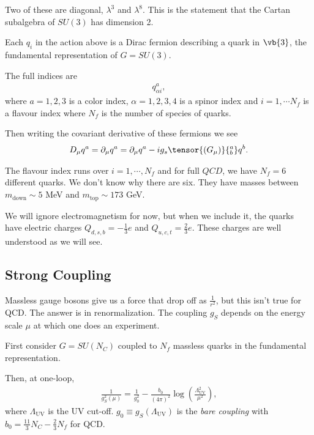 Two of these are diagonal, $\lambda^3$ and $\lambda^{8}$. This is the statement that the Cartan subalgebra of $SU\left( 3 \right) $ has dimension 2.

Each $q_{i}$ in the action above is a Dirac fermion describing a quark in $\vb{3}$, the fundamental representation of $G = SU\left( 3 \right) $.

The full indices are
\begin{align}
    q^{a}_{\alpha i}
,\end{align}
where $a=1,2,3$ is a color index, $\alpha = 1,2,3,4$ is a spinor index and $i=1,\cdots N_f$ is a flavour index where $N_f$ is the number of species of quarks.

Then writing the covariant derivative of these fermions we see
\begin{align}
    D_\mu q^{a} = \partial_\mu q^{a} = \partial_\mu q^{a} - i g_s \tensor{\left( G_\mu \right)}{^{a}_b} q^{b}
.\end{align}

The flavour index runs over $i = 1, \cdots, N_f$ and for full $QCD$, we have $N_f = 6$ different quarks. We don't know why there are six. They have masses between $m_\text{down} \sim  5$ MeV and $m_\text{top} \sim  173 $ GeV.

We will ignore electromagnetism for now, but when we include it, the quarks have electric charges $Q_{d,s,b} = -\frac{1}{3}e$ and $Q_{u,c,t} = \frac{2}{3}e$. These charges are well understood as we will see.

\subsection{Strong Coupling}

Massless gauge bosons give us a force that drop off as $\frac{1}{r^2}$, but this isn't true for QCD. The answer is in renormalization. The coupling $g_S$ depends on the energy scale $\mu$ at which one does an experiment.

First consider $G = SU \left( N_C \right)$ coupled to $N_f$ massless quarks in the fundamental representation.

Then, at one-loop,
\begin{align}
    \frac{1}{g_S^2 \left( \mu \right) } = \frac{1}{g_0^2} - \frac{b_0}{\left( 4\pi \right)^2} \log \left( \frac{\Lambda_{\text{UV}}^2}{\mu^2}\right) 
,\end{align}
where $\Lambda_\text{UV}$ is the UV cut-off. $g_0 \equiv g_S \left( \Lambda_\text{UV} \right)$ is the \emph{bare coupling} with $b_0 = \frac{11}{3} N_C - \frac{2}{3} N_f$ for QCD.
